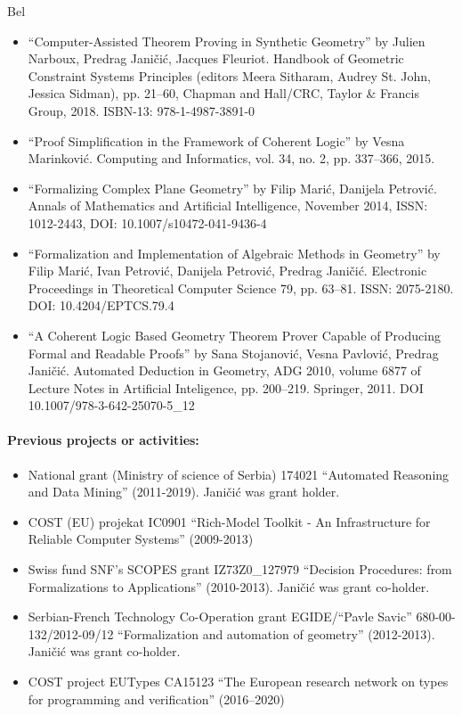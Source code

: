 \begin{sitedescription}{Bel}
  \begin{itemize}
  \item ``Computer-Assisted Theorem Proving in Synthetic Geometry'' by
    Julien Narboux, Predrag Janičić, Jacques Fleuriot. Handbook of
    Geometric Constraint Systems Principles (editors Meera Sitharam,
    Audrey St. John, Jessica Sidman), pp. 21--60, Chapman and
    Hall/CRC, Taylor \& Francis Group, 2018. ISBN-13: 978-1-4987-3891-0
  \item ``Proof Simplification in the Framework of Coherent Logic'' by
    Vesna Marinković. Computing and Informatics, vol. 34, no. 2,
    pp. 337--366, 2015.
  \item ``Formalizing Complex Plane Geometry'' by Filip Marić,
    Danijela Petrović. Annals of Mathematics and Artificial
    Intelligence, November 2014, ISSN: 1012-2443, DOI:
    10.1007/s10472-041-9436-4
  \item ``Formalization and Implementation of Algebraic Methods in
    Geometry'' by Filip Marić, Ivan Petrović, Danijela Petrović,
    Predrag Janičić. Electronic Proceedings in Theoretical Computer
    Science 79, pp. 63--81. ISSN: 2075-2180. DOI: 10.4204/EPTCS.79.4
  \item ``A Coherent Logic Based Geometry Theorem Prover Capable of
    Producing Formal and Readable Proofs'' by Sana Stojanović, Vesna
    Pavlović, Predrag Janičić. Automated Deduction in Geometry, ADG
    2010, volume 6877 of Lecture Notes in Artificial Inteligence,
    pp. 200--219. Springer, 2011. DOI 10.1007/978-3-642-25070-5\_12
  \end{itemize}
    
  \paragraph{Previous projects or activities:}
  
  \begin{itemize}
  \item National grant (Ministry of science of Serbia) 174021
    ``Automated Reasoning and Data Mining'' (2011-2019). Janičić was
    grant holder.
  \item COST (EU) projekat IC0901 ``Rich-Model Toolkit - An
    Infrastructure for Reliable Computer Systems'' (2009-2013)
  \item Swiss fund SNF's SCOPES grant IZ73Z0\_127979 ``Decision
    Procedures: from Formalizations to Applications''
    (2010-2013). Jani\v ci\'c was grant co-holder.
  \item Serbian-French Technology Co-Operation grant EGIDE/``Pavle
    Savic'' 680-00-132/2012-09/12 ``Formalization and automation of
    geometry'' (2012-2013). Jani\v ci\'c was grant co-holder.
  \item COST project EUTypes CA15123 ``The European research network on types for programming and verification'' (2016--2020) 
  \end{itemize}


\end{sitedescription}
